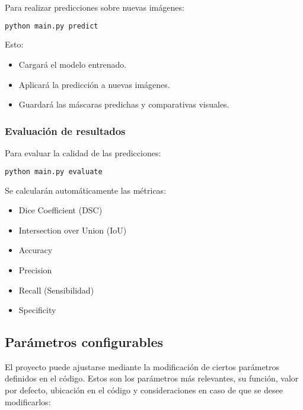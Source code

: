 \documentclass[12pt]{article}
\begin{document}
Para realizar predicciones sobre nuevas imágenes:

\begin{lstlisting}[language=bash]
python main.py predict
\end{lstlisting}

Esto:
\begin{itemize}
    \item Cargará el modelo entrenado.
    \item Aplicará la predicción a nuevas imágenes.
    \item Guardará las máscaras predichas y comparativas visuales.
\end{itemize}

\subsubsection{Evaluación de resultados}

Para evaluar la calidad de las predicciones:

\begin{lstlisting}[language=bash]
python main.py evaluate
\end{lstlisting}

Se calcularán automáticamente las métricas:
\begin{itemize}
    \item Dice Coefficient (DSC)
    \item Intersection over Union (IoU)
    \item Accuracy
    \item Precision
    \item Recall (Sensibilidad)
    \item Specificity
\end{itemize}

\subsection{Parámetros configurables}

El proyecto puede ajustarse mediante la modificación de ciertos parámetros definidos en el código. Estos son los parámetros más relevantes, su función, valor por defecto, ubicación en el código y consideraciones en caso de que se desee modificarlos:
\end{document}

